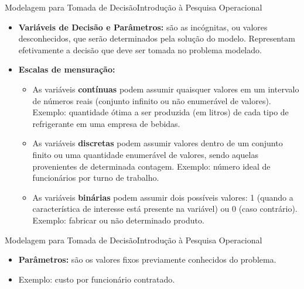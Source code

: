 \documentclass[t]{beamer}
\begin{document}
\begin{ftst}{Modelagem para Tomada de Decisão}{Introdução à Pesquisa Operacional}
\small
\begin{itemize}
    \item[\textbf{a.}] \textbf{Variáveis de Decisão e Parâmetros: }são as incógnitas, ou valores desconhecidos, que serão determinados pela solução do modelo. Representam efetivamente a decisão que deve ser tomada no problema modelado.
    
    \item  \textbf{Escalas de mensuração:}
    \begin{itemize}
        \footnotesize
        \item As variáveis \textbf{contínuas} podem assumir quaisquer valores em um intervalo de números reais (conjunto infinito ou não enumerável de valores). Exemplo: quantidade ótima a ser produzida (em litros) de cada tipo de refrigerante em uma empresa de bebidas.
        \item As variáveis \textbf{discretas} podem assumir valores dentro de um conjunto finito ou uma quantidade enumerável de valores, sendo aquelas provenientes de determinada contagem. Exemplo:  número ideal de funcionários por turno de trabalho.
        \item As variáveis \textbf{binárias} podem assumir dois possíveis valores: 1 (quando a característica de interesse está presente na variável) ou 0 (caso contrário). Exemplo: fabricar ou não determinado produto.
    \end{itemize}
\end{itemize}

\end{ftst}


\begin{ftst}{Modelagem para Tomada de Decisão}{Introdução à Pesquisa Operacional}
\small
\begin{itemize}
    \item[\textbf{b.}] \textbf{Parâmetros:} são os valores fixos previamente conhecidos do problema.
    \vone
    \item Exemplo: custo por funcionário contratado.
\end{itemize}

\end{ftst}

\end{document}
